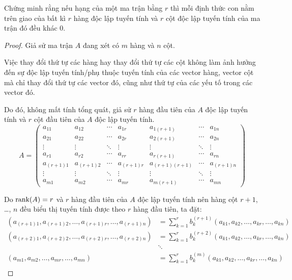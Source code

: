 \begin{exercise}
    Chứng minh rằng nếu hạng của một ma trận bằng $r$ thì mỗi định thức con nằm trên giao của bất kì $r$ hàng độc lập tuyến tính và $r$ cột độc lập tuyến tính của ma trận đó đều khác 0.
\end{exercise}

\begin{proof}
    Giả sử ma trận $A$ đang xét có $m$ hàng và $n$ cột.
    
    Việc thay đổi thứ tự các hàng hay thay đổi thứ tự các cột không làm ảnh hưởng đến sự độc lập tuyến tính/phụ thuộc tuyến tính của các vector hàng, vector cột mà chỉ thay đổi thứ tự các vector đó, cũng như thứ tự của các yếu tố trong các vector đó.
    
    Do đó, không mất tính tổng quát, giả sử $r$ hàng đầu tiên của $A$ độc lập tuyến tính và $r$ cột đầu tiên của $A$ độc lập tuyến tính.
    \[
        A =
        \begin{pmatrix}
            a_{11}     & a_{12}     & \cdots & a_{1r}     & a_{1(r+1)}     & \cdots & a_{1n}     \\
            a_{21}     & a_{22}     & \cdots & a_{2r}     & a_{2(r+1)}     & \cdots & a_{2n}     \\
            \vdots     & \vdots     & \ddots & \vdots     & \vdots         & \ddots & \vdots     \\
            a_{r1}     & a_{r2}     & \cdots & a_{rr}     & a_{r(r+1)}     & \cdots & a_{rn}     \\
            a_{(r+1)1} & a_{(r+1)2} & \cdots & a_{(r+1)r} & a_{(r+1)(r+1)} & \cdots & a_{(r+1)n} \\
            \vdots     & \vdots     & \ddots & \vdots     & \vdots         & \ddots & \vdots     \\
            a_{m1}     & a_{m2}     & \cdots & a_{mr}     & a_{m(r+1)}     & \cdots & a_{mn}
        \end{pmatrix}
    \]
    
    Do $\text{rank}(A) = r$ và $r$ hàng đầu tiên của $A$ độc lập tuyến tính nên hàng cột $r+1$, \ldots, $n$ đều biểu thị tuyến tính được theo $r$ hàng đầu tiên, ta đặt:
    \begin{align*}
        (a_{(r+1)1}, a_{(r+1)2}, \ldots, a_{(r+1)r}, \ldots, a_{(r+1)n}) & = \sum^{r}_{k=1}b_{k}^{(r+1)}(a_{k1}, a_{k2}, \ldots, a_{kr}, \ldots, a_{kn}) \\
        (a_{(r+2)1}, a_{(r+2)2}, \ldots, a_{(r+2)r}, \ldots, a_{(r+2)n}) & = \sum^{r}_{k=1}b_{k}^{(r+2)}(a_{k1}, a_{k2}, \ldots, a_{kr}, \ldots, a_{kn}) \\
                                                                         & \ddots                                                                        \\
        (a_{m1}, a_{m2}, \ldots, a_{mr}, \ldots, a_{mn})                 & = \sum^{r}_{k=1}b_{k}^{(m)}(a_{k1}, a_{k2}, \ldots, a_{kr}, \ldots, a_{kn})   \\
    \end{align*}
    

\end{proof}
